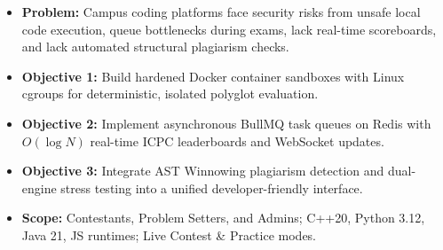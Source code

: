 \documentclass[10pt]{article}
\begin{document}
\begin{minipage}[t]{0.492\textwidth}
  \begin{tcolorbox}[
    equal height group=row2,
    colback=probbg, colframe=probframe,
    title={\textbf{\color{probtitle}Problem Statement \& Objectives}},
    fonttitle=\fontsize{8.5}{10}\selectfont,
    coltitle=probtitle, colbacktitle=probbg,
    boxrule=0.7pt, arc=1.5mm,
    top=3pt, bottom=3pt, left=4pt, right=4pt, toptitle=1pt, bottomtitle=1pt
  ]
  \fontsize{7.2}{8.6}\selectfont
  \begin{itemize}
    \item \textbf{Problem:} Campus coding platforms face security risks from unsafe local code execution, queue bottlenecks during exams, lack real-time scoreboards, and lack automated structural plagiarism checks.
    \item \textbf{Objective 1:} Build hardened Docker container sandboxes with Linux cgroups for deterministic, isolated polyglot evaluation.
    \item \textbf{Objective 2:} Implement asynchronous BullMQ task queues on Redis with $O(\log N)$ real-time ICPC leaderboards and WebSocket updates.
    \item \textbf{Objective 3:} Integrate AST Winnowing plagiarism detection and dual-engine stress testing into a unified developer-friendly interface.
    \item \textbf{Scope:} Contestants, Problem Setters, and Admins; C++20, Python 3.12, Java 21, JS runtimes; Live Contest \& Practice modes.
  \end{itemize}
  \end{tcolorbox}

  \vspace{1.5mm}


\end{minipage}
\end{document}

